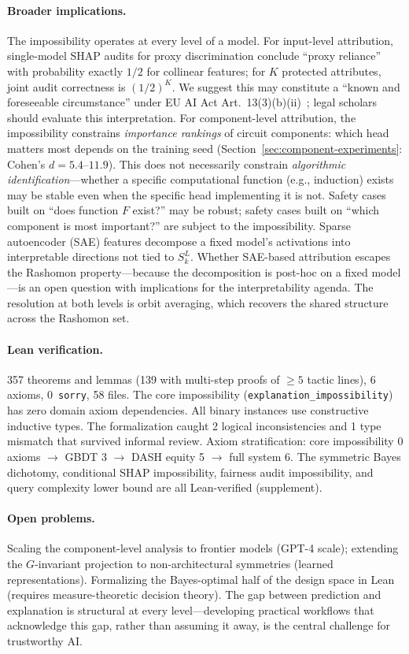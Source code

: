 \documentclass{article}
\begin{document}
\paragraph{Broader implications.}
The impossibility operates at every level of a model. For input-level attribution, single-model SHAP audits for proxy discrimination conclude ``proxy reliance'' with probability exactly $1/2$ for collinear features; for $K$ protected attributes, joint audit correctness is $(1/2)^K$. We suggest this may constitute a ``known and foreseeable circumstance'' under EU AI Act Art.~13(3)(b)(ii)~\citep{euaiact2024}; legal scholars should evaluate this interpretation.
For component-level attribution, the impossibility constrains \emph{importance rankings} of circuit components: which head matters most depends on the training seed (Section~\ref{sec:component-experiments}: Cohen's $d = 5.4$--$11.9$). This does not necessarily constrain \emph{algorithmic identification}---whether a specific computational function (e.g., induction) exists may be stable even when the specific head implementing it is not. Safety cases built on ``does function $F$ exist?'' may be robust; safety cases built on ``which component is most important?'' are subject to the impossibility.
Sparse autoencoder (SAE) features decompose a fixed model's activations into interpretable directions not tied to $S_k^L$. Whether SAE-based attribution escapes the Rashomon property---because the decomposition is post-hoc on a fixed model---is an open question with implications for the interpretability agenda.
The resolution at both levels is orbit averaging, which recovers the shared structure across the Rashomon set.

\paragraph{Lean verification.}
357 theorems and lemmas (139 with multi-step proofs of ${\geq}5$ tactic lines), 6 axioms, 0~\texttt{sorry}, 58 files. The core impossibility (\texttt{explanation\_impossibility}) has zero domain axiom dependencies. All binary instances use constructive inductive types. The formalization caught 2 logical inconsistencies and 1 type mismatch that survived informal review. Axiom stratification: core impossibility 0 axioms $\to$ GBDT 3 $\to$ DASH equity 5 $\to$ full system 6. The symmetric Bayes dichotomy, conditional SHAP impossibility, fairness audit impossibility, and query complexity lower bound are all Lean-verified (supplement).

\paragraph{Open problems.}
Scaling the component-level analysis to frontier models (GPT-4 scale); extending the $G$-invariant projection to non-architectural symmetries (learned representations). Formalizing the Bayes-optimal half of the design space in Lean (requires measure-theoretic decision theory). The gap between prediction and explanation is structural at every level---developing practical workflows that acknowledge this gap, rather than assuming it away, is the central challenge for trustworthy AI.
\end{document}

